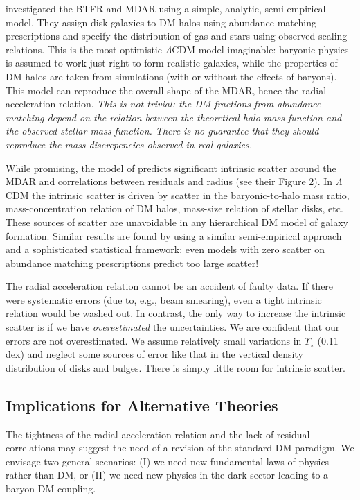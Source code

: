 \documentclass[apjl, twocolappendix]{emulateapj}
\begin{document}
\citet{DiCintio2016} investigated the BTFR and MDAR using a simple, analytic, semi-empirical model. They assign disk galaxies to DM halos using abundance matching prescriptions and specify the distribution of gas and stars using observed scaling relations. This is the most optimistic $\Lambda$CDM model imaginable: baryonic physics is assumed to work just right to form realistic galaxies, while the properties of DM halos are taken from simulations (with or without the effects of baryons). This model can reproduce the overall shape of the MDAR, hence the radial acceleration relation. \textit{This is not trivial: the DM fractions from abundance matching depend on the relation between the theoretical halo mass function and the observed stellar mass function. There is no guarantee that they should reproduce the mass discrepencies observed in real galaxies.}

While promising, the model of \citet{DiCintio2016} predicts significant intrinsic scatter around the MDAR and correlations between residuals and radius (see their Figure 2). In $\Lambda$CDM the intrinsic scatter is driven by scatter in the baryonic-to-halo mass ratio, mass-concentration relation of DM halos, mass-size relation of stellar disks, etc. These sources of scatter are unavoidable in any hierarchical DM model of galaxy formation. Similar results are found by \citet{Desmond2017} using a similar semi-empirical approach and a sophisticated statistical framework: even models with zero scatter on abundance matching prescriptions predict too large scatter!  

The radial acceleration relation cannot be an accident of faulty data. If there were systematic errors (due to, e.g., beam smearing), even a tight intrinsic relation would be washed out. In contrast, the only way to increase the intrinsic scatter is if we have \textit{overestimated} the uncertainties. We are confident that our errors are not overestimated. We assume relatively small variations in $\Upsilon_{\star}$ (0.11 dex) and neglect some sources of error like that in the vertical density distribution of disks and bulges. There is simply little room for intrinsic scatter.

\subsection{Implications for Alternative Theories}

The tightness of the radial acceleration relation and the lack of residual correlations may suggest the need of a revision of the standard DM paradigm. We envisage two general scenarios: (I) we need new fundamental laws of physics rather than DM, or (II) we need new physics in the dark sector leading to a baryon-DM coupling. 
\end{document}

